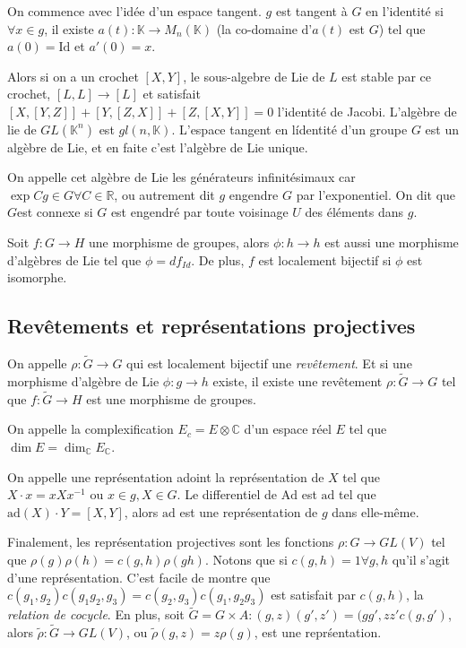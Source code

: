 \documentclass[10pt]{report}
\begin{document}
On commence avec l'id\'ee d'un espace tangent. $g$ est tangent \`a $G$ en l'identit\'e si $\forall x \in g$, il existe $a(t): \mathbb{K} \to M_n(\mathbb{K})$ (la co-domaine d'$a(t)$ est $G$) tel que $a(0) = \mathrm{Id}$ et $a'(0) = x$.

Alors si on a un crochet $[X,Y]$, le sous-algebre de Lie de $L$ est stable par ce crochet, $[L,L] \to [L]$ et satisfait $[X,[Y,Z]] +[Y,[Z,X]] +[Z,[X,Y]] = 0$ l'identit\'e de Jacobi. L'alg\`ebre de lie de $GL(\mathbb{K}^n)$ est $gl(n,\mathbb{K})$. L'espace tangent en l\'identit\'e d'un groupe $G$ est un alg\`ebre de Lie, et en faite c'est l'alg\`ebre de Lie unique.

On appelle cet alg\`ebre de Lie les g\'en\'erateurs infinit\'esimaux car $\exp Cg \in G \forall C\in\mathbb{R}$, ou autrement dit $g$ engendre $G$ par l'exponentiel. On dit que $G$est connexe si $G$ est engendr\'e par toute voisinage $U$ des \'el\'ements dans $g$.

Soit $f: G \to H$ une morphisme de groupes, alors $\phi:h\to h$ est aussi une morphisme d'alg\`ebres de Lie tel que $\phi = df_{Id}$. De plus, $f$ est localement bijectif si $\phi$ est isomorphe.

\subsection{Rev\^etements et repr\'esentations projectives}

On appelle $\rho: \tilde{G} \to G$ qui est localement bijectif une \emph{rev\^etement}. Et si une morphisme d'alg\`ebre de Lie $\phi: g\to h$ existe, il existe une rev\^etement $\rho: \tilde{G} \to G$ tel que $f:\tilde{G} \to H$ est une morphisme de groupes.

On appelle la complexification $E_c = E \otimes \mathbb{C}$ d'un espace r\'eel $E$ tel que $\dim E = \dim_{\mathbb{C}} E_{\mathbb{C}}$. 

On appelle une repr\'esentation adoint la repr\'esentation de $X$ tel que $X \cdot x = xXx^{-1}$ ou $x \in g, X \in G$. Le differentiel de $\mathrm{Ad}$ est $\mathrm{ad}$ tel que $\mathrm{ad}(X) \cdot Y = \left[ X,Y \right]$, alors $\mathrm{ad}$ est une repr\'esentation de $g$ dans elle-m\^eme.

Finalement, les repr\'esentation projectives sont les fonctions $\rho: G \to GL(V)$ tel que $\rho(g) \rho(h) = c(g,h) \rho(gh)$. Notons que si $c(g,h) = 1 \forall g,h$ qu'il s'agit d'une repr\'esentation. C'est facile de montre que $c(g_1, g_2)c(g_1g_2,g_3) = c(g_2,g_3)c(g_1,g_2g_3)$ est satisfait par $c(g,h)$, la \emph{relation de cocycle}. En plus, soit $\tilde{G}= G \times A: (g,z)(g',z') = (gg', zz' c(g,g')$, alors $\tilde{\rho}: \tilde{G} \to GL(V)$, ou $\tilde{\rho}(g,z) = z\rho(g)$, est une repr\'sentation.
\end{document}
